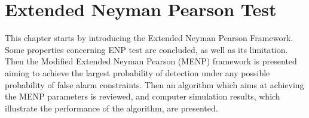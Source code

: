 \chapter{Extended Neyman Pearson Test}

\newcommand{\bom}{\boldsymbol{\omega}}
This chapter starts by introducing the Extended Neyman Pearson Framework. Some properties concerning ENP test are concluded, as well as its limitation. Then the Modified Extended Neyman Pearson (MENP) framework is presented aiming to achieve the largest probability of detection under any possible probability of false alarm constraints. Then an algorithm which aims at achieving the MENP parameters is reviewed, and  computer simulation results, which illustrate the performance of the algorithm, are presented. 



\typeout{}


\typeout{}


\typeout{}


\typeout{}


\typeout{}

                     
